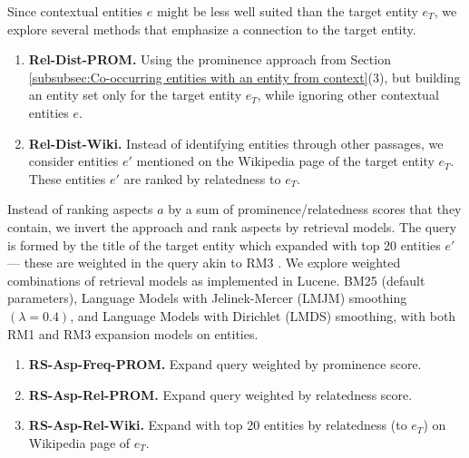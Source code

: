 Since contextual entities $e$ might be less well suited than the target entity $e_T$, we explore several methods that emphasize a connection to the target entity.




\begin{enumerate}
    \item \textbf{Rel-Dist-PROM.} Using the prominence approach from Section \ref{subsubsec:Co-occurring entities with an entity from context}(3), but building an entity set only for the target entity $e_T$, while ignoring other contextual entities $e$.
    \item \textbf{Rel-Dist-Wiki.} Instead of identifying entities through other passages, we consider entities $e'$ mentioned on the Wikipedia page of the target entity $e_T$. These entities $e'$ are ranked by relatedness to $e_T$.
\end{enumerate}

Instead of ranking aspects $a$ by a sum of prominence/relatedness scores that they contain, we invert the approach and rank aspects by retrieval models. The query is formed by the title of the target entity which expanded with top 20 entities $e'$ --- these are weighted in the query akin to RM3 \cite{lavrenko2001relevance}. We explore weighted combinations of retrieval models as implemented in Lucene. BM25 (default parameters), Language Models with Jelinek-Mercer (LMJM) smoothing $(\lambda = 0.4)$, and Language Models with Dirichlet (LMDS) smoothing, with both RM1 and RM3 expansion models on entities.


    
\begin{enumerate}        
    \item \textbf{RS-Asp-Freq-PROM.} Expand query weighted by prominence score.
    \item \textbf{RS-Asp-Rel-PROM.} Expand query weighted by relatedness score.
    \item \textbf{RS-Asp-Rel-Wiki.} Expand with top 20 entities by relatedness (to $e_T$) on Wikipedia page of $e_T$.
\end{enumerate}




